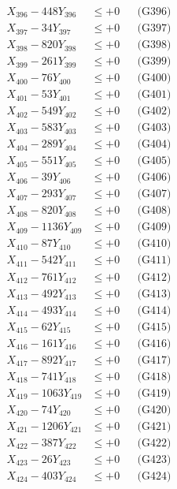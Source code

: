 \documentclass[a4paper,10pt]{article}
\begin{document}
{\begin{align}
X_{396} - 448Y_{396} &\leq +0 && \text{(G396)} \\
X_{397} - 34Y_{397} &\leq +0 && \text{(G397)} \\
X_{398} - 820Y_{398} &\leq +0 && \text{(G398)} \\
X_{399} - 261Y_{399} &\leq +0 && \text{(G399)} \\
X_{400} - 76Y_{400} &\leq +0 && \text{(G400)} \\
\allowbreak
X_{401} - 53Y_{401} &\leq +0 && \text{(G401)} \\
X_{402} - 549Y_{402} &\leq +0 && \text{(G402)} \\
X_{403} - 583Y_{403} &\leq +0 && \text{(G403)} \\
X_{404} - 289Y_{404} &\leq +0 && \text{(G404)} \\
X_{405} - 551Y_{405} &\leq +0 && \text{(G405)} \\
X_{406} - 39Y_{406} &\leq +0 && \text{(G406)} \\
X_{407} - 293Y_{407} &\leq +0 && \text{(G407)} \\
X_{408} - 820Y_{408} &\leq +0 && \text{(G408)} \\
X_{409} - 1136Y_{409} &\leq +0 && \text{(G409)} \\
X_{410} - 87Y_{410} &\leq +0 && \text{(G410)} \\
\allowbreak
X_{411} - 542Y_{411} &\leq +0 && \text{(G411)} \\
X_{412} - 761Y_{412} &\leq +0 && \text{(G412)} \\
X_{413} - 492Y_{413} &\leq +0 && \text{(G413)} \\
X_{414} - 493Y_{414} &\leq +0 && \text{(G414)} \\
X_{415} - 62Y_{415} &\leq +0 && \text{(G415)} \\
X_{416} - 161Y_{416} &\leq +0 && \text{(G416)} \\
X_{417} - 892Y_{417} &\leq +0 && \text{(G417)} \\
X_{418} - 741Y_{418} &\leq +0 && \text{(G418)} \\
X_{419} - 1063Y_{419} &\leq +0 && \text{(G419)} \\
X_{420} - 74Y_{420} &\leq +0 && \text{(G420)} \\
\allowbreak
X_{421} - 1206Y_{421} &\leq +0 && \text{(G421)} \\
X_{422} - 387Y_{422} &\leq +0 && \text{(G422)} \\
X_{423} - 26Y_{423} &\leq +0 && \text{(G423)} \\
X_{424} - 403Y_{424} &\leq +0 && \text{(G424)} \\

\end{align}}
\end{document}
